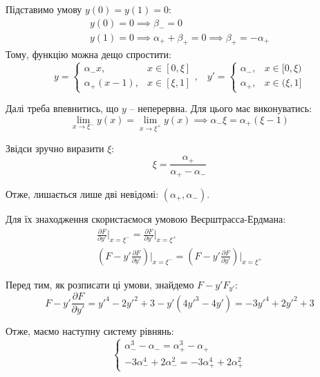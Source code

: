 \documentclass[oneside,solution]{template}
\begin{document}
Підставимо умову $y(0)=y(1)=0$:
\begin{gather*}
    y(0) = 0 \implies \beta_- = 0 \\
    y(1) = 0 \implies \alpha_+ + \beta_+ = 0 \implies \beta_+ = - \alpha_+
\end{gather*}
Тому, функцію можна дещо спростити:
\begin{equation*}
    y = \begin{cases}
        \alpha_- x, & x \in [0,\xi] \\
        \alpha_+(x-1), & x \in [\xi,1]
    \end{cases}, \;\;\; y' = \begin{cases}
        \alpha_-, & x \in [0,\xi) \\
        \alpha_+, & x \in (\xi, 1]
    \end{cases}
\end{equation*}

Далі треба впевнитись, що $y$ -- неперервна. Для цього має виконуватись:
\begin{equation*}
    \lim_{x\to\xi^-}y(x) = \lim_{x \to \xi^+}y(x) \implies \alpha_-\xi = \alpha_+(\xi-1)
\end{equation*}

Звідси зручно виразити $\xi$:
\begin{equation*}
    \xi = \frac{\alpha_+}{\alpha_+-\alpha_-}
\end{equation*}

Отже, лишається лише дві невідомі: $(\alpha_+,\alpha_-)$. 

Для їх знаходження скористаємося умовою Веєрштрасса-Ердмана:
\begin{gather*}
    \frac{\partial F}{\partial y'}\Big|_{x=\xi^-} = \frac{\partial F}{\partial y'}\Big|_{x=\xi^+} \\
    \left(F-y'\frac{\partial F}{\partial y'}\right)\Big|_{x=\xi^-} = \left(F-y'\frac{\partial F}{\partial y'}\right)\Big|_{x=\xi^+}
\end{gather*}

Перед тим, як розписати ці умови, знайдемо $F-y'F_{y'}$:
\begin{equation*}
    F-y'\frac{\partial F}{\partial y'} = y'^4 - 2y'^2 + 3 - y'(4y'^3-4y') = -3y'^4+2y'^2+3
\end{equation*}

Отже, маємо наступну систему рівнянь:
\begin{equation*}
    \begin{cases}
        \alpha_-^3-\alpha_- = \alpha_+^3 - \alpha_+ \\
        -3\alpha_-^4 + 2\alpha_-^2 = -3\alpha_+^4 + 2\alpha_+^2
    \end{cases}
\end{equation*}
\end{document}

